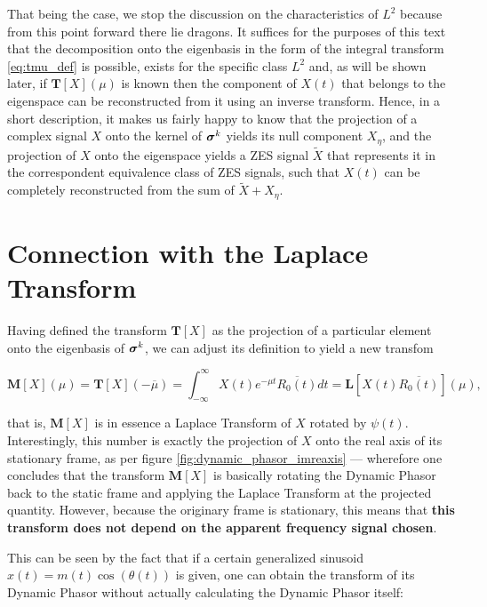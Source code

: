	That being the case, we stop the discussion on the characteristics of $L^2$ because from this point forward there lie dragons. It suffices for the purposes of this text that the decomposition onto the eigenbasis in the form of the integral transform \eqref{eq:tmu_def} is possible, exists for the specific class $L^2$ and, as will be shown later, if $\mathbf{T} \left[X\right]\left(\mu\right)$ is known then the component of $X(t)$ that belongs to the eigenspace can be reconstructed from it using an inverse transform. Hence, in a short description, it makes us fairly happy to know that the projection of a complex signal $X$ onto the kernel of $\boldsymbol{\sigma}^{k}$ yields its null component $X_\eta$, and the projection of $X$ onto the eigenspace yields a ZES signal $\tilde{X}$ that represents it in the correspondent equivalence class of ZES signals, such that $X(t)$ can be completely reconstructed from the sum of $\tilde{X} + X_\eta$.

\section{Connection with the Laplace Transform} \label{sec:laplace_connection}%

	Having defined the transform $\mathbf{T}\left[X\right]$ as the projection of a particular element onto the eigenbasis of $\boldsymbol{\sigma}^{k}$, we can adjust its definition to yield a new transfom

\begin{equation} \mathbf{M}\left[X\right]\left(\mu\right) = \mathbf{T}\left[X\right]\left(-\overline{\mu}\right) = \int_{-\infty}^{\infty} X(t) e^{-\mu t} \overline{R_0(t)}dt = \mathbf{L}\left[X(t) \overline{R_0(t)}\right]\left(\mu\right) ,\label{eq:mtransf_mu_def}\end{equation}

	\noindent that is, $\mathbf{M}\left[X\right]$ is in essence a Laplace Transform of $X$ rotated by $\psi(t)$. Interestingly, this number is exactly the projection of $X$ onto the real axis of its stationary frame, as per figure \ref{fig:dynamic_phasor_imreaxis} — wherefore one concludes that the transform $\mathbf{M}\left[X\right]$ is basically rotating the Dynamic Phasor back to the static frame and applying the Laplace Transform at the projected quantity. However, because the originary frame is stationary, this means that \textbf{this transform does not depend on the apparent frequency signal chosen}.

	This can be seen by the fact that if a certain generalized sinusoid $x(t) = m(t)\cos\left(\theta(t)\right)$ is given, one can obtain the transform of its Dynamic Phasor without actually calculating the Dynamic Phasor itself:

